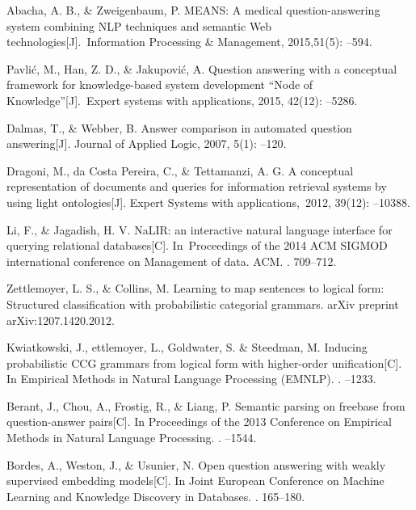 \begin{thebibliography}{10}
Abacha, A. B., \& Zweigenbaum, P.
\newblock MEANS: A medical question-answering system combining NLP techniques and semantic Web technologies[J]. Information Processing \& Management, 2015,51(5):
--594.

Pavlić, M., Han, Z. D., \& Jakupović, A. 
\newblock Question answering with a conceptual framework for knowledge-based system development “Node of Knowledge”[J]. Expert systems with applications, 2015, 42(12):
--5286.

Dalmas, T., \& Webber, B.
\newblock Answer comparison in automated question answering[J].
\newblock  Journal of Applied Logic, 2007, 5(1):
--120.

Dragoni, M., da Costa Pereira, C., \& Tettamanzi, A. G.
\newblock A conceptual representation of documents and queries for information retrieval systems by using light ontologies[J].
\newblock Expert Systems with applications, 2012, 39(12):
--10388.

Li, F., \& Jagadish, H. V. 
\newblock NaLIR: an interactive natural language interface for querying relational databases[C].
\newblock In Proceedings of the 2014 ACM SIGMOD international conference on Management of data. ACM.
. 709--712.

Zettlemoyer, L. S., \& Collins, M.
\newblock Learning to map sentences to logical form: Structured classification with probabilistic categorial grammars. arXiv preprint arXiv:1207.1420.2012.

Kwiatkowski, J., ettlemoyer, L., Goldwater, S. \& Steedman, M.
\newblock Inducing probabilistic CCG grammars from logical form with higher-order unification[C].
\newblock In Empirical Methods in Natural Language Processing (EMNLP).
.
--1233.

Berant, J., Chou, A., Frostig, R., \& Liang, P. 
\newblock Semantic parsing on freebase from question-answer pairs[C].
\newblock In Proceedings of the 2013 Conference on Empirical Methods in Natural Language Processing.
.
--1544.

Bordes, A., Weston, J., \& Usunier, N.
\newblock Open question answering with weakly supervised embedding models[C].
\newblock In Joint European Conference on Machine Learning and Knowledge Discovery in Databases.
. 165--180.


\end{thebibliography}
